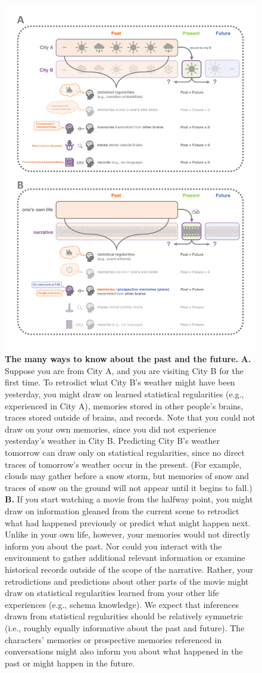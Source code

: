 \documentclass[10pt]{article}
\begin{document}
\begin{figure}[tp]
  \centering
  \includegraphics[width=.65\textwidth]{intro2}
\vspace{-0.2in}
  \caption{ \textbf{The many ways to know about the past and the future.} \textbf{A.}
    Suppose you are from City A, and you are visiting City B for the first time.  To retrodict what City B's weather might have been yesterday, you might draw on learned statistical regularities (e.g., experienced in City A), memories stored in other people's brains, traces stored outside of brains, and records.  Note that you could not draw on your own memories, since you did not experience yesterday's weather in City B.  Predicting City B's weather tomorrow can draw only on statistical regularities, since no direct traces of tomorrow's weather occur in the present.  (For example, clouds may gather before a snow storm, but memories of snow and traces of snow on the ground will not appear until it begins to fall.)   \textbf{B.}  If you start watching a movie from the halfway point, you might draw on information gleaned from the current scene to retrodict what had happened previously or predict what might happen next.  Unlike in your own life, however, your memories would not directly inform you about the past.  Nor could you interact with the environment to gather additional relevant information or examine historical records outside of the scope of the narrative.  Rather, your retrodictions and predictions about other parts of the movie might draw on statistical regularities learned from your other life experiences (e.g., schema knowledge).  We expect that inferences drawn from statistical regularities should be relatively symmetric (i.e., roughly equally informative about the past and future).  The characters' memories or prospective memories referenced in conversations might also inform you about what happened in the past or might happen in the future.}
  \label{fig:intro2}
\end{figure}
\end{document}

